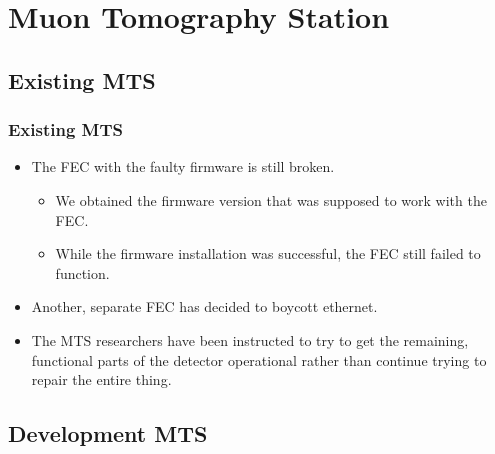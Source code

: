 \documentclass[aspectratio=169]{beamer}
\begin{document}

\section{Muon Tomography Station}


\subsection{Existing MTS}

\begin{frame}

  \frametitle{Existing MTS}

  \begin{itemize}
    \item The FEC with the faulty firmware is still broken.
      \begin{itemize}
        \item We obtained the firmware version that was supposed to work with
          the FEC.
        \item While the firmware installation was successful, the FEC still
          failed to function.
      \end{itemize}
    \item Another, separate FEC has decided to boycott ethernet.
    \item The MTS researchers have been instructed to try to get the remaining,
      functional parts of the detector operational rather than continue trying to
      repair the entire thing.
  \end{itemize}


\end{frame}



\subsection{Development MTS}
\end{document}
